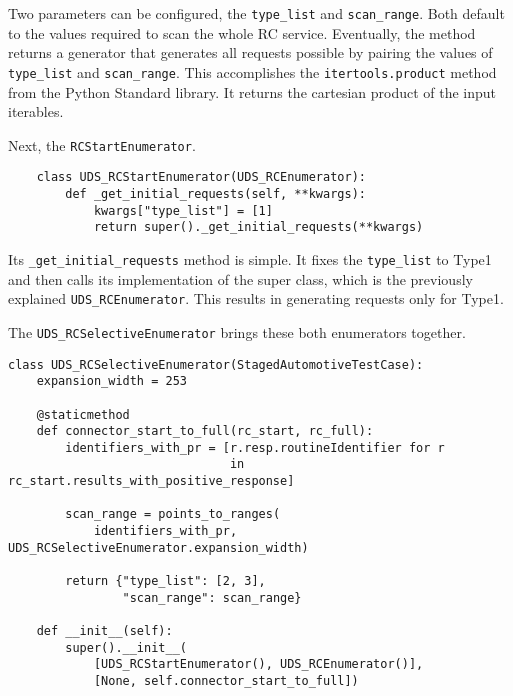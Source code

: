 Two parameters can be configured, the \texttt{type_list} and \texttt{scan_range}. Both default to the values required to scan the whole RC service. Eventually, the method returns a generator that generates all requests possible by pairing the values of \texttt{type_list} and \texttt{scan_range}. This accomplishes the \texttt{itertools.product} method from the Python Standard library. It returns the cartesian product of the input iterables.

Next, the \texttt{RCStartEnumerator}.

\begin{samepage}
\begin{verbatim}
    class UDS_RCStartEnumerator(UDS_RCEnumerator):
        def _get_initial_requests(self, **kwargs):
            kwargs["type_list"] = [1]
            return super()._get_initial_requests(**kwargs)
\end{verbatim}
\end{samepage}

Its \texttt{_get_initial_requests} method is simple. It fixes the \texttt{type_list} to Type1 and then calls its implementation of the super class, which is the previously explained \texttt{UDS_RCEnumerator}. This results in generating requests only for Type1.

The \texttt{UDS_RCSelectiveEnumerator} brings these both enumerators together.

\begin{samepage}
\begin{verbatim}
class UDS_RCSelectiveEnumerator(StagedAutomotiveTestCase):
    expansion_width = 253

    @staticmethod
    def connector_start_to_full(rc_start, rc_full):
        identifiers_with_pr = [r.resp.routineIdentifier for r
                               in rc_start.results_with_positive_response]

        scan_range = points_to_ranges(
            identifiers_with_pr, UDS_RCSelectiveEnumerator.expansion_width)

        return {"type_list": [2, 3],
                "scan_range": scan_range}

    def __init__(self):
        super().__init__(
            [UDS_RCStartEnumerator(), UDS_RCEnumerator()],
            [None, self.connector_start_to_full])
\end{verbatim}
\end{samepage}

